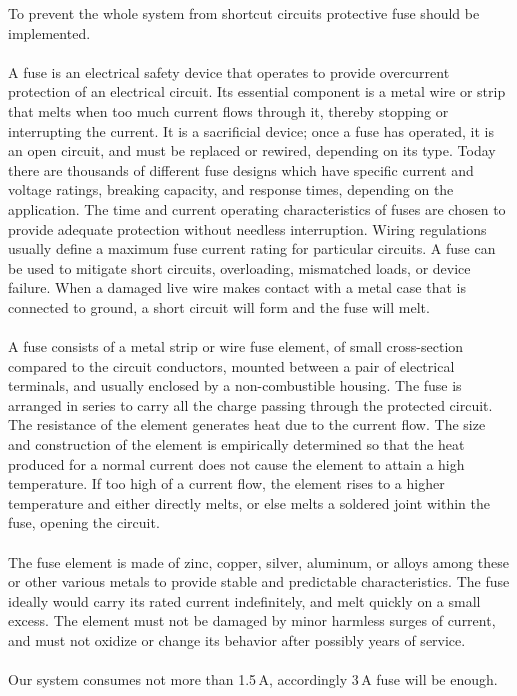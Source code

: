 \documentclass[]{IEEEphot}
\begin{document}
To prevent the whole system from shortcut circuits protective fuse should be implemented.
\\\\
A fuse is an electrical safety device that operates to provide overcurrent protection of an electrical circuit. Its essential component is a metal wire or strip that melts when too much current flows through it, thereby stopping or interrupting the current. It is a sacrificial device; once a fuse has operated, it is an open circuit, and must be replaced or rewired, depending on its type. Today there are thousands of different fuse designs which have specific current and voltage ratings, breaking capacity, and response times, depending on the application. The time and current operating characteristics of fuses are chosen to provide adequate protection without needless interruption. Wiring regulations usually define a maximum fuse current rating for particular circuits. A fuse can be used to mitigate short circuits, overloading, mismatched loads, or device failure. When a damaged live wire makes contact with a metal case that is connected to ground, a short circuit will form and the fuse will melt.
\\\\
A fuse consists of a metal strip or wire fuse element, of small cross-section compared to the circuit conductors, mounted between a pair of electrical terminals, and usually enclosed by a non-combustible housing. The fuse is arranged in series to carry all the charge passing through the protected circuit. The resistance of the element generates heat due to the current flow. The size and construction of the element is empirically determined so that the heat produced for a normal current does not cause the element to attain a high temperature. If too high of a current flow, the element rises to a higher temperature and either directly melts, or else melts a soldered joint within the fuse, opening the circuit.
\\\\
The fuse element is made of zinc, copper, silver, aluminum, or alloys among these or other various metals to provide stable and predictable characteristics. The fuse ideally would carry its rated current indefinitely, and melt quickly on a small excess. The element must not be damaged by minor harmless surges of current, and must not oxidize or change its behavior after possibly years of service. 
\\\\
Our system consumes not more than 1.5\,A, accordingly 3\,A fuse will be enough.
\end{document}
